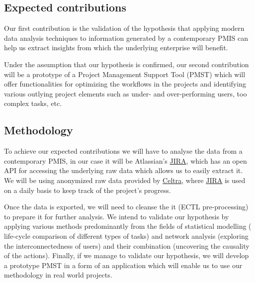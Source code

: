 \documentclass[a4paper, 12pt]{article}
\begin{document}
\subsection{Expected contributions}


Our first contribution is the validation of the hypothesis that applying modern data analysis techniques to information generated by a contemporary PMIS can help us extract insights from which the underlying enterprise will benefit. 

Under the assumption that our hypothesis is confirmed, our second contribution will be a prototype of a Project Management Support Tool (PMST) which will offer functionalities for optimizing the workflows in the projects and identifying various outlying project elements such as under- and over-performing users, too complex tasks, etc.

\subsection{Methodology}


To achieve our expected contributions we will have to analyse the data from a contemporary PMIS, in our case it will be Atlassian's \href{https://www.atlassian.com/software/jira}{JIRA}, which has an open API for accessing the underlying raw data which allows us to easily extract it. We will be using anonymized raw data provided by \href{https://www.celtra.com/}{Celtra}, where \href{https://www.atlassian.com/software/jira}{JIRA} is used on a daily basis to keep track of the project's progress.

Once the data is exported, we will need to cleanse the it (ECTL pre-processing) to prepare it for further analysis. We intend to validate our hypothesis by applying various methods predominantly from the fields of statistical modelling ( life-cycle comparison of different types of tasks) and network analysis (exploring the interconnectedness of users) and their combination (uncovering the causality of the actions). Finally, if we manage to validate our hypothesis, we will develop a prototype PMST in a form of an application which will enable us to use our methodology in real world projects.
\end{document}
